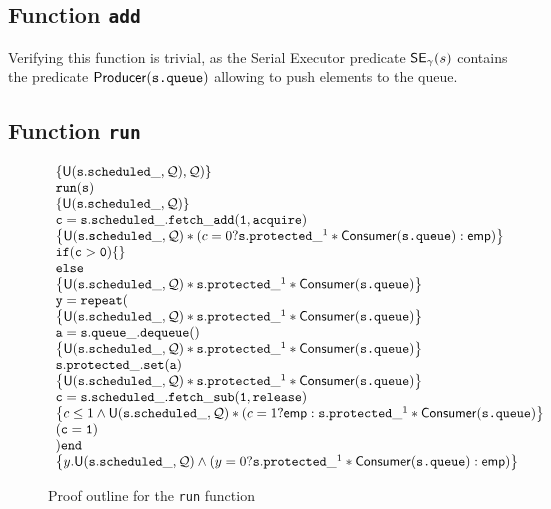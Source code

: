 \subsection{Function \texttt{add}}
Verifying this function is trivial, as the Serial Executor predicate $\mathsf{SE}_\gamma(s)$ contains the predicate $\mathsf{Producer}(\texttt{s.queue})$ allowing to push elements to the queue.

\subsection{Function \texttt{run}}

\begin{figure}
\begin{equation*}
		\begin{array}{l}
				\left\{\mathsf{U}(\mathtt{s.scheduled\_}, \mathcal{Q}), \mathcal{Q})\right\} \\
		\mathtt{run(s)} \\
		\left\{\mathsf{U}(\mathtt{s.scheduled\_}, \mathcal{Q}) \right\} \\
		\mathtt{c = s.scheduled\_.fetch\_add(1, acquire)} \\
		\left\{ \mathsf{U}(\mathtt{s.scheduled\_}, \mathcal{Q}) * (c = 0 ? \mathtt{s.protected\_}^1 * \mathsf{Consumer}(\texttt{s.queue}) : \mathsf{emp}) \right\}\\
		\mathtt{if(c > 0) \{\}}\\
		\mathtt{else} \\
		\left\{\mathsf{U}(\mathtt{s.scheduled\_}, \mathcal{Q}) * \mathtt{s.protected\_}^1 * \mathsf{Consumer}(\texttt{s.queue}) \right\} \\
		\mathtt{y = repeat (} \\
		\left\{\mathsf{U}(\mathtt{s.scheduled\_}, \mathcal{Q})* \mathtt{s.protected\_}^1 * \mathsf{Consumer}(\texttt{s.queue}) \right\} \\
		\mathtt{a = s.queue\_.dequeue()} \\
		\left\{\mathsf{U}(\mathtt{s.scheduled\_}, \mathcal{Q})* \mathtt{s.protected\_}^1 * \mathsf{Consumer}(\texttt{s.queue}) \right\} \\
		\mathtt{s.protected\_.set(a)} \\
		\left\{\mathsf{U}(\mathtt{s.scheduled\_}, \mathcal{Q})* \mathtt{s.protected\_}^1 * \mathsf{Consumer}(\texttt{s.queue}) \right\} \\
		\mathtt{c = s.scheduled\_.fetch\_sub(1, release)}\\	
		\left\{c \leq 1 \land \mathsf{U}(\mathtt{s.scheduled\_}, \mathcal{Q}) * (c = 1 ? \mathsf{emp} : \mathtt{s.protected\_}^1 * \mathsf{Consumer}(\texttt{s.queue}) \right\} \\
		\mathtt{(c = 1)}\\
		\mathtt{) end}\\
				\left\{ y. \mathsf{U}(\mathtt{s.scheduled\_}, \mathcal{Q}) \land (y=0?\mathtt{s.protected\_}^1 * \mathsf{Consumer}(\texttt{s.queue}) : \mathsf{emp}) \right\}
\end{array}
\end{equation*}

		\caption{Proof outline for the \texttt{run} function}
		\label{fig:run}
\end{figure}

